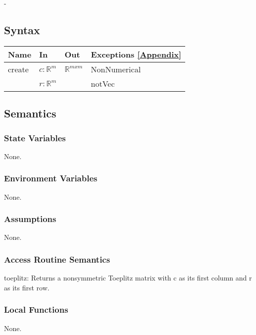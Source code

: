 \documentclass[12pt, titlepage]{article}
\begin{document}
- 

\subsection{Syntax}

\begin{center}
	\begin{tabular}{p{2cm} p{6cm} p{6cm} p{3cm}}
		\hline
		\textbf{Name} & \textbf{In} & \textbf{Out} & \textbf{Exceptions} 
		\ref{Appendix}\\
		\hline
		create & $c : \mathbb{R}^{m}$ & $\mathbb{R}^{mxm}$ & 
		NonNumerical \\
		& $r : \mathbb{R}^{m}$ &  & notVec \\ 
		\hline
	\end{tabular}
\end{center}

\subsection{Semantics}

\subsubsection{State Variables}

None.

\subsubsection{Environment Variables}

None.

\subsubsection{Assumptions}

None.

\subsubsection{Access Routine Semantics}

\noindent toeplitz: Returns a nonsymmetric Toeplitz matrix with c as its first 
column and r as its first row.

\subsubsection{Local Functions} 

None. 
\end{document}
